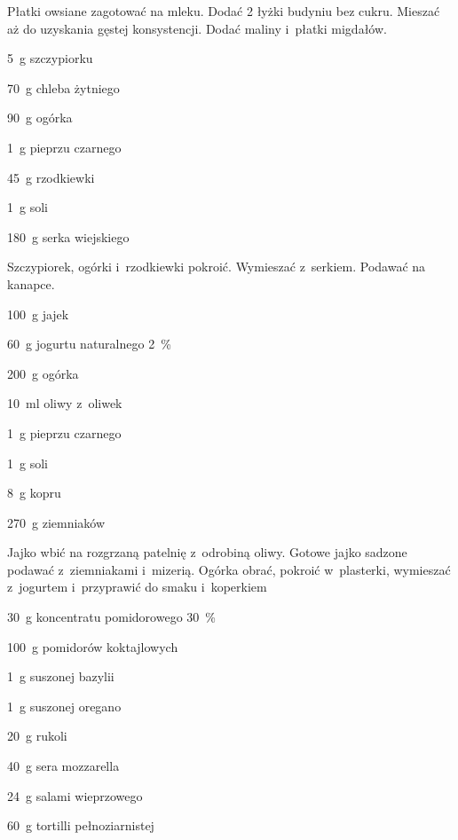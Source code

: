 \documentclass[../kucharek.tex]{subfiles}
\begin{document}
Płatki owsiane zagotować na mleku. Dodać \num{2} łyżki budyniu bez cukru.
Mieszać aż do uzyskania gęstej konsystencji. Dodać maliny i~płatki migdałów.


\begin{Ingred}
    \item \qty{5}{\gram} szczypiorku
    \item \qty{70}{\gram} chleba żytniego
    \item \qty{90}{\gram} ogórka
    \item \qty{1}{\gram} pieprzu czarnego
    \item \qty{45}{\gram} rzodkiewki
    \item \qty{1}{\gram} soli
    \item \qty{180}{\gram} serka wiejskiego
\end{Ingred}

Szczypiorek, ogórki i~rzodkiewki pokroić. Wymieszać z~serkiem. Podawać na
kanapce.


\begin{Ingred}
    \item \qty{100}{\gram} jajek
    \item \qty{60}{\gram} jogurtu naturalnego \qty{2}{\percent}
    \item \qty{200}{\gram} ogórka
    \item \qty{10}{\milli\litre} oliwy z~oliwek
    \item \qty{1}{\gram} pieprzu czarnego
    \item \qty{1}{\gram} soli
    \item \qty{8}{\gram} kopru
    \item \qty{270}{\gram} ziemniaków
\end{Ingred}

Jajko wbić na rozgrzaną patelnię z~odrobiną oliwy. Gotowe jajko sadzone podawać
z~ziemniakami i~mizerią. Ogórka obrać, pokroić w~plasterki, wymieszać
z~jogurtem i~przyprawić do smaku i~koperkiem


\begin{Ingred}
    \item \qty{30}{\gram} koncentratu pomidorowego \qty{30}{\percent}
    \item \qty{100}{\gram} pomidorów koktajlowych
    \item \qty{1}{\gram} suszonej bazylii
    \item \qty{1}{\gram} suszonej oregano
    \item \qty{20}{\gram} rukoli
    \item \qty{40}{\gram} sera mozzarella
    \item \qty{24}{\gram} salami wieprzowego
    \item \qty{60}{\gram} tortilli pełnoziarnistej
\end{Ingred}
\end{document}
